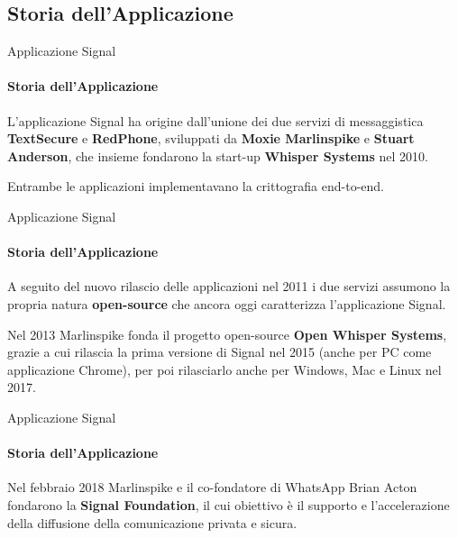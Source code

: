 \subsection{Storia dell'Applicazione}

\begin{frame}{Applicazione Signal}
    \framesubtitle{Storia dell'Applicazione}

    L’applicazione Signal ha origine dall’unione dei due servizi di messaggistica \textbf{TextSecure} e \textbf{RedPhone}, sviluppati da \textbf{Moxie Marlinspike} e \textbf{Stuart Anderson}, che insieme fondarono la start-up \textbf{Whisper Systems} nel 2010.\newline \pause

    Entrambe le applicazioni implementavano la crittografia end-to-end.

\end{frame}

\begin{frame}{Applicazione Signal}
    \framesubtitle{Storia dell'Applicazione}

    A seguito del nuovo rilascio delle applicazioni nel 2011 i due servizi assumono la propria natura \textbf{open-source} che ancora oggi caratterizza l’applicazione Signal.\newline \pause
    
    Nel 2013 Marlinspike fonda il progetto open-source \textbf{Open Whisper Systems}, grazie a cui rilascia la prima versione di Signal nel 2015 (anche per PC come applicazione Chrome), per poi rilasciarlo anche per Windows, Mac e Linux nel 2017. \newline
    
\end{frame}

\begin{frame}{Applicazione Signal}
    \framesubtitle{Storia dell'Applicazione}

  Nel febbraio 2018 Marlinspike e il co-fondatore di WhatsApp Brian Acton fondarono la \textbf{Signal Foundation}, il cui obiettivo è il supporto e l’accelerazione della diffusione della comunicazione privata e sicura.
  \cite{Lumb}
    
\end{frame}